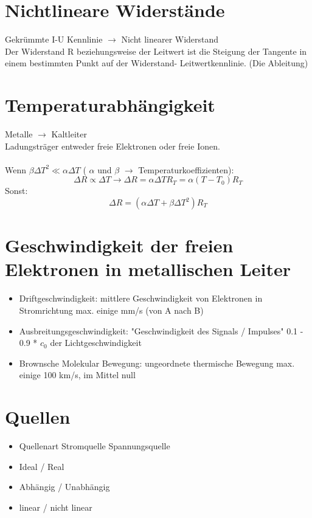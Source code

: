 \documentclass{article}
\begin{document}
	\section{Nichtlineare Widerstände}
	Gekrümmte I-U Kennlinie $\rightarrow$ Nicht linearer Widerstand \\
	Der Widerstand R beziehungsweise der Leitwert ist die Steigung der Tangente in einem bestimmten Punkt auf der Widerstand- Leitwertkennlinie. (Die Ableitung)
	\section{Temperaturabhängigkeit}
	Metalle $\rightarrow$ Kaltleiter \\
	Ladungsträger entweder freie Elektronen oder freie Ionen. \\\\
	Wenn  $\beta \Delta T^2 \ll \alpha \Delta T$ ( $\alpha$ und $\beta$ $\rightarrow$ Temperaturkoeffizienten):
	\begin{equation}
		\Delta R \propto \Delta T \rightarrow  \Delta R = \alpha \Delta T R_T = \alpha(T - T_0)R_T
	\end{equation}
	Sonst:
	\begin{equation}
		\Delta R = (\alpha \Delta T + \beta \Delta T^2)R_T
	\end{equation}
	\section{Geschwindigkeit der freien Elektronen in metallischen Leiter}
	\begin{itemize}
		\item Driftgeschwindigkeit: mittlere Geschwindigkeit von Elektronen in Stromrichtung max. einige mm/s (von A nach B)
		\item Ausbreitungsgeschwindigkeit: "Geschwindigkeit des Signals / Impulses" 0.1 - 0.9 * $c_0$ der Lichtgeschwindigkeit
		\item Brownsche Molekular Bewegung: ungeordnete thermische Bewegung max. einige 100 km/s, im Mittel null
	\end{itemize}
	\newpage
	\section{Quellen}
	\begin{itemize}
		\item Quellenart
		\subitem Stromquelle
		\subitem Spannungsquelle
		\item Ideal / Real
		\item Abhängig / Unabhängig
		\item linear / nicht linear
	\end{itemize}
\end{document}
